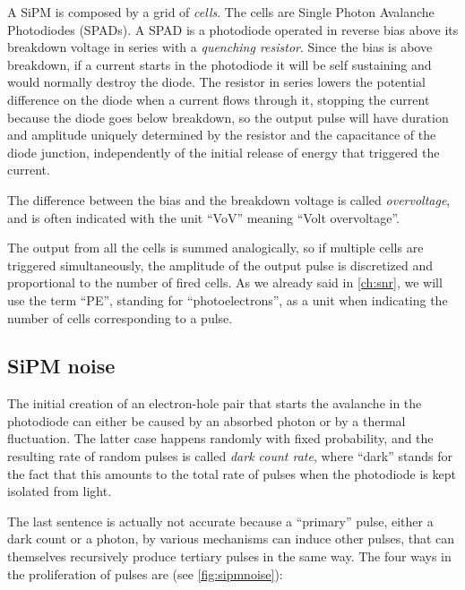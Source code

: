 A SiPM is composed by a grid of \emph{cells}. The cells are Single Photon
Avalanche Photodiodes (SPADs). A SPAD is a photodiode operated in reverse bias
above its breakdown voltage in series with a \emph{quenching resistor}. Since
the bias is above breakdown, if a current starts in the photodiode it will be
self sustaining and would normally destroy the diode. The resistor in series
lowers the potential difference on the diode when a current flows through it,
stopping the current because the diode goes below breakdown, so the output
pulse will have duration and amplitude uniquely determined by the resistor and
the capacitance of the diode junction, independently of the initial release of
energy that triggered the current.

The difference between the bias and the breakdown voltage is called
\emph{overvoltage}, and is often indicated with the unit ``\si{VoV}'' meaning
``Volt overvoltage''.

The output from all the cells is summed analogically, so if multiple cells are
triggered simultaneously, the amplitude of the output pulse is discretized and
proportional to the number of fired cells. As we already said in
\autoref{ch:snr}, we will use the term ``PE'', standing for ``photoelectrons'',
as a unit when indicating the number of cells corresponding to a pulse.

\subsection{SiPM noise}

The initial creation of an electron-hole pair that starts the avalanche in the
photodiode can either be caused by an absorbed photon or by a thermal
fluctuation. The latter case happens randomly with fixed probability, and the
resulting rate of random pulses is called \emph{dark count rate}, where
``dark'' stands for the fact that this amounts to the total rate of pulses when
the photodiode is kept isolated from light.

The last sentence is actually not accurate because a ``primary'' pulse, either
a dark count or a photon, by various mechanisms can induce other pulses, that
can themselves recursively produce tertiary pulses in the same way. The four
ways in the proliferation of pulses are (see \autoref{fig:sipmnoise}):

